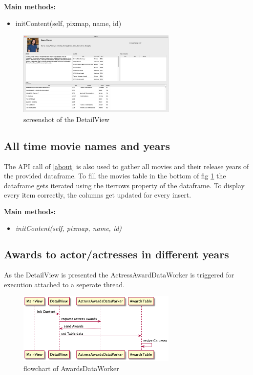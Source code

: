 \documentclass[12pt]{article}
\begin{document}
\textbf{Main methods:}
\begin{itemize}
      \item initContent(self, pixmap, name, id)
\end{itemize}

\begin{figure}[h]
      \centering
      \includegraphics[width=0.7\textwidth]{img/detail-window-screen.png}
      \caption{\label{fig:detail-window-screen} screenshot of the DetailView}
\end{figure}

\subsection{All time movie names and years} \label{movies}
The API call of \ref{about} is also used to gather all movies and their release years of
the provided dataframe. To fill the movies table in the bottom of fig \ref{fig:detail-window-screen} the dataframe gets iterated using the iterrows property of the
dataframe. To display every item correctly, the columns get updated for every insert.

\textbf{Main methods:}
\begin{itemize}
      \item \textit{initContent(self, pixmap, name, id)}
\end{itemize}

\subsection{Awards to actor/actresses in different years} \label{awards}
As the DetailView is presented the ActressAwardDataWorker is triggered for 
execution attached to a seperate thread. 

\begin{figure}[h]
      \centering
      \includegraphics[width=0.7\textwidth]{img/actress-awardsdata-worker-sequence.png}
      \caption{\label{fig:awardsdata-worker-sequence} flowchart of AwardsDataWorker}
\end{figure}
\end{document}
